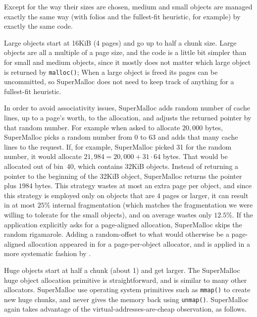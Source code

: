 \documentclass[natbib,sort&compress]{sigplanconf}
\newcommand{\code}[1]{\texttt{#1}}
\begin{document}
Except for the way their sizes are chosen, medium and small objects
are managed exactly the same way (with folios and the fullest-fit
heuristic, for example) by exactly the same code.


Large objects start at 16KiB (4 pages) and go up to half a chunk size.
Large objects are all a multiple of a page size, and the code is a
little bit simpler than for small and medium objects, since it mostly
does not matter which large object is returned by \code{malloc()};
When a large object is freed its pages can be uncommitted, so
SuperMalloc does not need to keep track of anything for a fullest-fit
heuristic.

In order to avoid associativity issues, SuperMalloc adds random number
of cache lines, up to a page's worth, to the allocation, and adjusts
the returned pointer by that random number.  For example when asked to
allocate $20,000$ bytes, SuperMalloc picks a random number from 0 to
63 and adds that many cache lines to the request.  If, for example,
SuperMalloc picked 31 for the random number, it would allocate $21,984
= 20,000+31\cdot64$ bytes.  That would be allocated out of bin~40,
which contains $32$KiB objects.  Instead of returning a pointer to the
beginning of the $32$KiB object, SuperMalloc returns the pointer plus
$1984$ bytes.  This strategy wastes at most an extra page per object,
and since this strategy is employed only on objects that are $4$ pages
or larger, it can result in at most $25$\% internal fragmentation
(which matches the fragmentation we were willing to tolerate for the
small objects), and on average wastes only $12.5$\%.  If the
application explicitly asks for a page-aligned allocation, SuperMalloc
skips the random rigamarole.  Adding a random-offset to what would
otherwise be a page-aligned allocation appeared in \cite{LvinNoBe08}
for a page-per-object allocator, and is applied in a more systematic
fashion by \cite{AfekDiMo11}.


Huge objects start at half a chunk (about \unit{1}\mebi\byte{}) and
get larger.  The SuperMalloc huge object allocation primitive is
straightforward, and is similar to many other allocators.  SuperMalloc
use operating system primitives such as \code{mmap()} to create new
huge chunks, and never gives the memory back using \code{unmap()}.
SuperMalloc again takes advantage of the virtual-addresses-are-cheap
observation, as follows.
\end{document}
